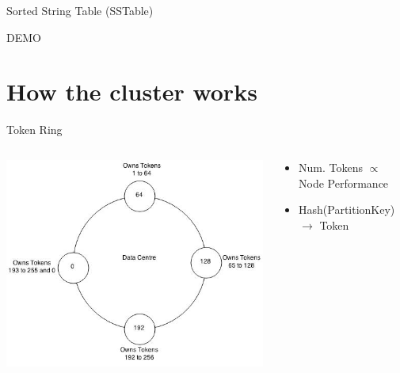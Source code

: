 \documentclass[
  10pt
]{beamer}
\begin{document}
\begin{frame}{Sorted String Table (SSTable)}
  \begin{center}
    \Huge DEMO
  \end{center}
\end{frame}

\section{How the cluster works}  %

\begin{frame}{Token Ring \cite{cassandra_architecture_akhil}}
  \begin{columns}
    \begin{column}{0.6\textwidth}
    \includegraphics[width=\columnwidth]{resources/token_ring.jpg}
    \end{column}
    \begin{column}{0.4\textwidth}
      \begin{itemize}
        \item Num. Tokens $\propto$ Node Performance
        \item Hash(PartitionKey) \\ $\rightarrow$ Token
      \end{itemize}
    \end{column}
  \end{columns}
\end{frame}
\end{document}
